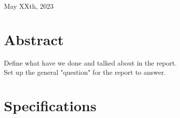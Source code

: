 \documentclass{article}
\begin{document}
\begin{titlepage}
    
    
    \vfill\vfill\vfill %
    
    {\large May XXth, 2023} %
    
    
     
    
    \vfill %
    
  \end{titlepage}


\pagebreak

\section*{Abstract}
Define what have we done and talked about in the report.\\
Set up the general "question" for the report to answer.\\


\vspace{11cm}
\tableofcontents
\pagebreak
 \addtocounter{section}{1}
\section*{Specifications}
\end{document}
